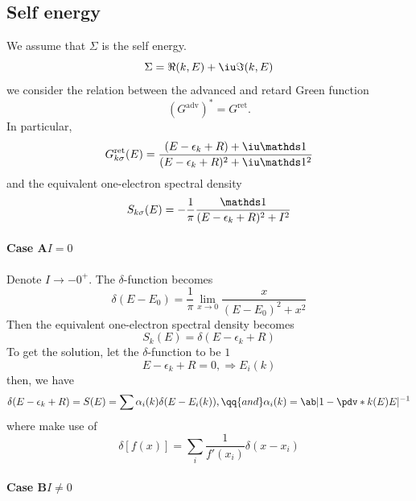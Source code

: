 \subsection{Self energy}

We assume that $\Sigma$ is the self energy.
\[
  \Sigma = \Re(k, E) + \iu\Im(k, E)
\]
we consider the relation between the advanced and retard Green function
\[
  (G^\text{adv})^* = G^\text{ret}.
\]
In particular,
\begin{equation}
  G_{k\sigma}^\text{ret}(E)
= \frac {(E - \epsilon_k + R) + \iu\identity}
        {(E - \epsilon_k + R)^2 + \iu\identity^2}
\end{equation}
and the equivalent one-electron spectral density
\begin{equation}
  S_{k\sigma}(E) = -\frac1\pi \frac\identity{(E - \epsilon_k + R)^2 + I^2}
\end{equation}

\paragraph{Case A\quad $I = 0$}

Denote $I \to -0^+$. The $\delta$-function becomes
\[
  \delta(E - E_0) = \frac1\pi \lim_{x\to0} \frac x{(E - E_0)^2 + x^2}
\]
Then the equivalent one-electron spectral density becomes
\begin{equation}
  S_k(E) = \delta(E - \epsilon_k + R)
\end{equation}
To get the solution, let the $\delta$-function to be $1$
\[
  E - \epsilon_k + R = 0, \Rightarrow E_i(k)
\]
then, we have
\[
  \delta(E - \epsilon_k + R) = S(E)
= \sum \alpha_i(k) \delta(E - E_i(k)), \qq{and}
  \alpha_i(k) = \ab|1 - \pdv*{k(E)}E|^{-1}
\]
where make use of
\[
  \delta[f(x)] = \sum_i \frac1{f'(x_i)} \delta(x - x_i)
\]

\paragraph{Case B\quad $I \neq 0$}

